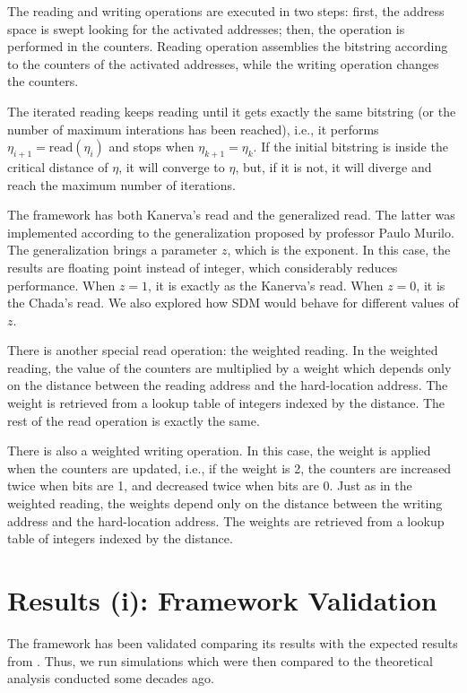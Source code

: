 The reading and writing operations are executed in two steps: first, the address space is swept looking for the activated addresses; then, the operation is performed in the counters. Reading operation assemblies the bitstring according to the counters of the activated addresses, while the writing operation changes the counters.

The iterated reading keeps reading until it gets exactly the same bitstring (or the number of maximum interations has been reached), i.e., it performs $\eta_{i+1} = \text{read}(\eta_i)$ and stops when $\eta_{k+1} = \eta_{k}$. If the initial bitstring is inside the critical distance of $\eta$, it will converge to $\eta$, but, if it is not, it will diverge and reach the maximum number of iterations.

The framework has both Kanerva's read and the generalized read. The latter was implemented according to the generalization proposed by professor Paulo Murilo. The generalization brings a parameter $z$, which is the exponent. In this case, the results are floating point instead of integer, which considerably reduces performance. When $z=1$, it is exactly as the Kanerva's read. When $z=0$, it is the Chada's read. We also explored how SDM would behave for different values of $z$.

There is another special read operation: the weighted reading. In the weighted reading, the value of the counters are multiplied by a weight which depends only on the distance between the reading address and the hard-location address. The weight is retrieved from a lookup table of integers indexed by the distance. The rest of the read operation is exactly the same.

There is also a weighted writing operation. In this case, the weight is applied when the counters are updated, i.e., if the weight is 2, the counters are increased twice when bits are 1, and decreased twice when bits are 0. Just as in the weighted reading, the weights depend only on the distance between the writing address and the hard-location address. The weights are retrieved from a lookup table of integers indexed by the distance.


\chapter{Results (i): Framework Validation}

The framework has been validated comparing its results with the expected results from \citet{Kanerva1988}. Thus, we run simulations which were then compared to the theoretical analysis conducted some decades ago.

